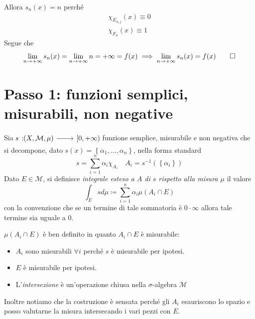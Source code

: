 \begin{demonstration}
\begin{itemize}
\begin{itemize}
\begin{equation*}
\end{equation*}
Allora $s_n(x)=n$ perché
\begin{gather*}
	\chi_{E_{n,j}}(x)\equiv 0\\
	\chi_{F_n}(x)\equiv 1
\end{gather*}
Segue che
\begin{equation*}
	\lim_{n\to+\infty}s_n(x)=\lim_{n\to+\infty}n=+\infty=f(x)\implies \lim_{n\to+\infty}s_n(x)=f(x)\qedhere
\end{equation*}
\end{itemize}
\end{itemize}
\end{demonstration}

\section{Passo 1: funzioni semplici, misurabili, non negative}
\begin{define}
	Sia $\funz{s}{\left(X,\mathcal{M},\mu\right)}{\left[0,+\infty\right)}$ funzione semplice, misurabile e non negativa che si decompone, dato $s(x)=\left\{\alpha_1,\ldots, \alpha_n\right\}$, nella forma standard
	\begin{equation*}
		s=\sum_{i=1}^{n}\alpha_i\chi_{A_i}\quad A_i=s^{-1}\left(\left\{\alpha_i\right\}\right)
	\end{equation*}
	Dato $E\in\mathcal{M}$, si definisce \textit{integrale esteso a $A$ di $s$ rispetto alla misura $\mu$} il valore
	\begin{equation}
		\int_{E}sd\mu\coloneqq\sum_{i=1}^{n}\alpha_i\mu\left(A_i\cap E\right)
	\end{equation}
	con la convenzione che se un termine di tale sommatoria è $0\cdot \infty$ allora tale termine sia uguale a $0$.
\end{define}
\begin{observe}
	$\mu\left(A_i\cap E\right)$ è ben definito in quanto $A_i\cap E$ è misurabile:
	\begin{itemize}
		\item $A_i$ sono misurabili $\forall i$ perché $s$ è misurabile per ipotesi.
		\item $E$ è misurabile per ipotesi.
		\item L'\textit{intersezione} è un'operazione chiusa nella $\sigma$-algebra $\mathcal{M}$
	\end{itemize}
	Inoltre notiamo che la costruzione è sensata perché gli $A_i$ esauriscono lo spazio e posso valutarne la misura intersecando i vari pezzi con $E$.
\end{observe}
